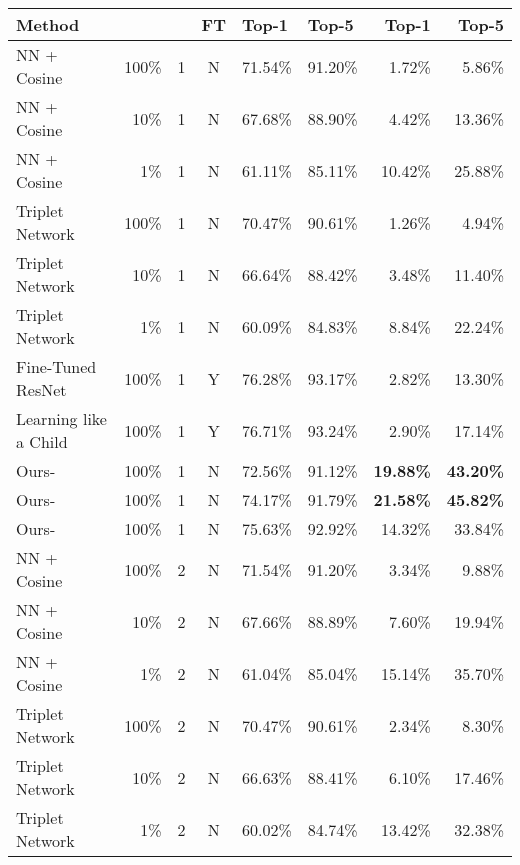 \begin{table*}
    \small
    \centering
    \setlength{\tabcolsep}{1.0em}
    \begin{tabular}{lrccll:rr}
        \toprule
        Method &  &  & FT & Top-1  & Top-5  & Top-1  & Top-5 \\
        \midrule
        NN + Cosine  & 100\% & 1 & N & 71.54\% & 91.20\% & 1.72\% & 5.86\% \\
        NN + Cosine  &  10\% & 1 & N & 67.68\% & 88.90\% & 4.42\% & 13.36\% \\
        NN + Cosine  &   1\% & 1 & N & 61.11\% & 85.11\% & 10.42\% & 25.88\% \\
        Triplet Network~\cite{siamese,lin2017transfer}  & 100\% & 1 & N & 70.47\% & 90.61\% & 1.26\% & 4.94\% \\
        Triplet Network~\cite{siamese,lin2017transfer}   &  10\% & 1 & N & 66.64\% & 88.42\% & 3.48\% & 11.40\% \\
        Triplet Network~\cite{siamese,lin2017transfer}   &   1\% & 1 & N & 60.09\% & 84.83\% & 8.84\% & 22.24\% \\
        Fine-Tuned ResNet~\cite{DBLP:conf/cvpr/HeZRS16} & 100\% & 1 & Y & 76.28\% & 93.17\% & 2.82\% & 13.30\% \\
        Learning like a Child~\cite{mao2015learning} & 100\% & 1 & Y & 76.71\% & 93.24\% & 2.90\% & 17.14\% \\
        \hdashline
        Ours-         & 100\% & 1 & N & 72.56\% & 91.12\% & {\bf\color{blue}19.88\%} & {\bf\color{blue}43.20\%} \\
        Ours-         & 100\% & 1 & N & 74.17\% & 91.79\% & {\bf\color{red}21.58\%} & {\bf\color{red}45.82\%} \\
        Ours-      & 100\% & 1 & N & 75.63\% & 92.92\% & 14.32\% & 33.84\% \\
        \midrule
        NN + Cosine  & 100\% & 2 & N & 71.54\% & 91.20\% & 3.34\% & 9.88\% \\
        NN + Cosine  &  10\% & 2 & N & 67.66\% & 88.89\% & 7.60\% & 19.94\% \\
        NN + Cosine  &   1\% & 2 & N & 61.04\% & 85.04\% & 15.14\% & 35.70\% \\
        Triplet Network~\cite{siamese,lin2017transfer}  & 100\% & 2 & N & 70.47\% & 90.61\% & 2.34\% & 8.30\% \\
        Triplet Network~\cite{siamese,lin2017transfer}  &  10\% & 2 & N & 66.63\% & 88.41\% & 6.10\% & 17.46\% \\
        Triplet Network~\cite{siamese,lin2017transfer}  &   1\% & 2 & N & 60.02\% & 84.74\% & 13.42\% & 32.38\% \\

\end{tabular}
\end{table*}

